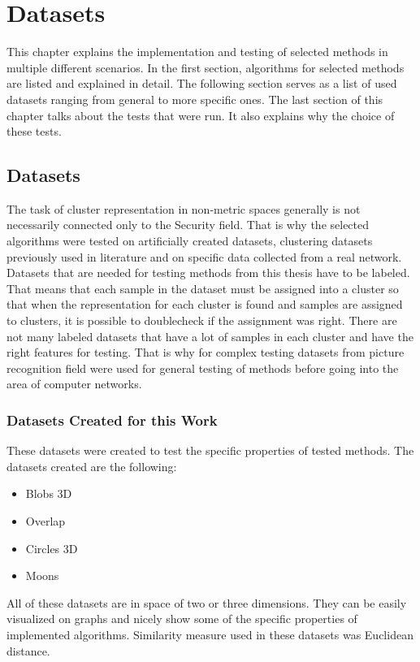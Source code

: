 \documentclass[thesis=B,english]{FITthesis}[2012/10/20]
\begin{document}

\chapter{Datasets}\label{ch:datasets}

This chapter explains the implementation and testing of selected methods in multiple different scenarios.
In the first section, algorithms for selected methods are listed and explained in detail.
The following section serves as a list of used datasets ranging from general to more specific ones.
The last section of this chapter talks about the tests that were run.
It also explains why the choice of these tests.

\section{Datasets}\label{sec:datasets}
The task of cluster representation in non-metric spaces generally is not necessarily connected only to the Security field.
That is why the selected algorithms were tested on artificially created datasets, clustering datasets previously used in literature and on specific data collected from a real network.
Datasets that are needed for testing methods from this thesis have to be labeled.
That means that each sample in the dataset must be assigned into a cluster so that when the representation for each cluster is found and samples are assigned to clusters, it is possible to doublecheck if the assignment was right.
There are not many labeled datasets that have a lot of samples in each cluster and have the right features for testing. 
That is why for complex testing datasets from picture recognition field were used for general testing of methods before going into the area of computer networks.

\subsection{Datasets Created for this Work}

These datasets were created to test the specific properties of tested methods.
The datasets created are the following:
\begin{itemize}
    \item Blobs 3D
    \item Overlap
    \item Circles 3D
    \item Moons
\end{itemize}
All of these datasets are in space of two or three dimensions.
They can be easily visualized on graphs and nicely show some of the specific properties of implemented algorithms.
Similarity measure used in these datasets was Euclidean distance. \\
\end{document}
